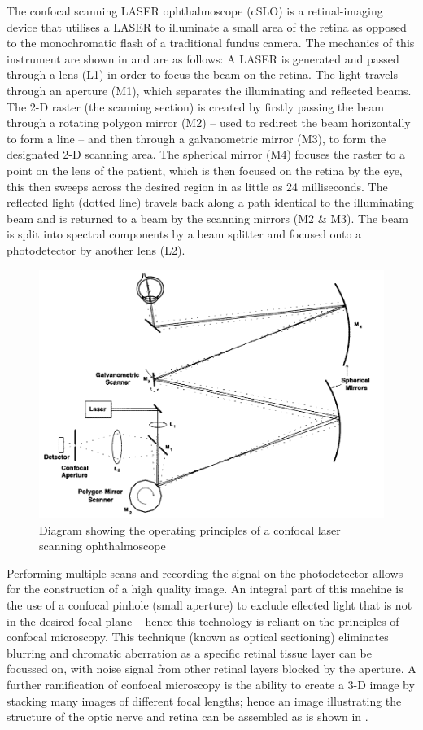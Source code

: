 The confocal scanning LASER ophthalmoscope (cSLO) is a retinal-imaging device
that utilises a LASER to illuminate a small area of the retina as opposed to
the monochromatic flash of a traditional fundus camera. The mechanics of this
instrument are shown in  and are as follows: A LASER is generated
and passed through a lens (L1) in order to focus the beam on the retina. The
light travels through an aperture (M1), which separates the illuminating and
reflected beams. The 2-D raster (the scanning section) is created by firstly
passing the beam through a rotating polygon mirror (M2) – used to redirect
the beam horizontally to form a line – and then through a galvanometric
mirror (M3), to form the designated 2-D scanning area. The spherical mirror
(M4) focuses the raster to a point on the lens of the patient, which is then
focused on the retina by the eye, this then sweeps across the desired region
in as little as 24 milliseconds. The reflected light (dotted line) travels
back along a path identical to the illuminating beam and is returned to a
beam by the scanning mirrors (M2 \& M3). The beam is split into spectral
components by a beam splitter and focused onto a photodetector by another
lens (L2).\cite{webb1987confocal}

\begin{figure}[htbp]
\centering
\includegraphics{figures/cslo}
\caption{Diagram showing the operating principles of a confocal laser scanning ophthalmoscope}
\label{fig:cslo}
\end{figure}


Performing multiple scans and recording the signal on the photodetector
allows for the construction of a high quality image. An integral part of
this machine is the use of a confocal pinhole (small aperture) to exclude
eflected light that is not in the desired focal plane – hence this technology
is reliant on the principles of confocal microscopy. This technique (known as
optical sectioning) eliminates blurring and chromatic aberration as a specific
retinal tissue layer can be focussed on, with noise signal from other retinal
layers blocked by the aperture.\cite{sharp2004scanning} A further ramification
of confocal microscopy is the ability to create a 3-D image by stacking many
images of different focal lengths; hence an image illustrating the structure
of the optic nerve and retina can be assembled as is shown in .

